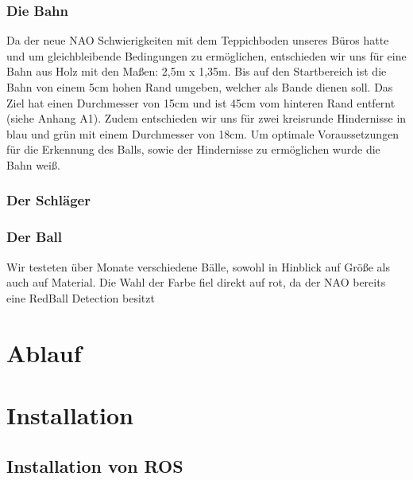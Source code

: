 \documentclass{scrartcl}
\begin{document}
\subsubsection{Die Bahn}
Da der neue NAO Schwierigkeiten mit dem Teppichboden unseres Büros hatte und um gleichbleibende Bedingungen zu ermöglichen, entschieden wir uns für eine Bahn aus Holz mit den Maßen: 2,5m x 1,35m. Bis auf den Startbereich ist die Bahn von einem 5cm hohen Rand umgeben, welcher als Bande dienen soll. Das Ziel hat einen Durchmesser von 15cm und ist 45cm vom hinteren Rand entfernt (siehe Anhang A1). Zudem entschieden wir uns für zwei kreisrunde Hindernisse in blau und grün mit einem Durchmesser von 18cm. Um  optimale Voraussetzungen für die Erkennung des Balls, sowie der Hindernisse zu ermöglichen wurde die Bahn weiß.

\subsubsection{Der Schläger}

\subsubsection{Der Ball}
Wir testeten über Monate verschiedene Bälle, sowohl in Hinblick auf Größe als auch auf Material. Die Wahl der Farbe fiel direkt auf rot, da der NAO bereits eine RedBall Detection besitzt

\section{Ablauf}



\section{Installation}


\subsection{Installation von ROS}
\end{document}
